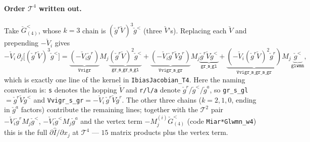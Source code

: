 \documentclass[11pt,a4paper]{article}
\begin{document}
\paragraph{Order $\mathcal T^4$ written out.}
Take $\check G^<_{(4)}$, whose $k=3$ chain is $(\check g^r\check V)^3\check g^<$
(three $\check V$'s).  Replacing each $\check V$ and prepending $-\check V_i$ gives
\begin{equation}
  -\check V_i\,\partial_j\!\big[(\check g^r\check V)^3\check g^<\big]
  = \underbrace{(-\check V_i\check g^r)}_{\texttt{Vvigr}}M_j\underbrace{(\check g^r\check V)^2\check g^<}_{\texttt{gr\_s\_gr\_s\_gl}}
  + \underbrace{(-\check V_i\check g^r\check V\check g^r)}_{\texttt{Vvigr\_s\_gr}}M_j\underbrace{\check g^r\check V\check g^<}_{\texttt{gr\_s\_gl}}
  + \underbrace{(-\check V_i(\check g^r\check V)^2\check g^r)}_{\texttt{Vvigr\_s\_gr\_s\_gr}}M_j\underbrace{\check g^<}_{\texttt{glwmn}} ,
  \label{eq:T4_k3}
\end{equation}
which is exactly one line of the kernel in \texttt{IbiasJacobian\_T4}.  Here the
naming convention is: \texttt{s} denotes the hopping $\check V$ and
\texttt{r/l/a} denote $\check g^r/\check g^</\check g^a$, so
\texttt{gr\_s\_gl}$=\check g^r\check V\check g^<$ and
\texttt{Vvigr\_s\_gr}$=-\check V_i\,\check g^r\check V\check g^r$.  The other three
chains ($k=2,1,0$, ending in $\check g^a$ factors) contribute the remaining
lines; together with the $\mathcal T^2$ pair $-\check V_i\check g^r M_j\check g^<$,
$-\check V_i\check g^< M_j\check g^a$ and the vertex term $-M^{(i)}_j\check
G^<_{(4)}$ (code \texttt{Miar*Glwmn\_w4}) this is the full
$\partial\hat I/\partial x_j$ at $\mathcal T^4$ --- $15$ matrix products plus the
vertex term.
\end{document}
